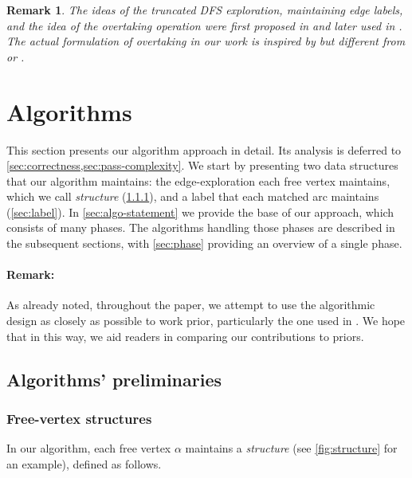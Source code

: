 \documentclass{article}
\newcommand{\alp}{\alpha}
\newtheorem{remark}{Remark}
\begin{document}
\begin{remark}
The ideas of the truncated DFS exploration, maintaining edge labels, and the idea of the overtaking operation were first proposed in \cite{eggert2009bipartite} and later used in \cite{FMU22}.
The actual formulation of overtaking in our work is inspired by but different from \cite{eggert2009bipartite} or \cite{FMU22}.
\end{remark}

\section{Algorithms} \label{sec:alg}
This section presents our algorithm approach in detail. 
Its analysis is deferred to \cref{sec:correctness,sec:pass-complexity}.
We start by presenting two data structures that our algorithm maintains: the edge-exploration each free vertex maintains, which we call \emph{structure} (\cref{sec:structure}), and a label that each matched arc maintains (\cref{sec:label}).
In \cref{sec:algo-statement} we provide the base of our approach, which consists of many phases. The algorithms handling those phases are described in the subsequent sections, with \cref{sec:phase} providing an overview of a single phase.

\paragraph{Remark:} As already noted, throughout the paper, we attempt to use the algorithmic design as closely as possible to work prior, particularly the one used in \cite{FMU22}. 
We hope that in this way, we aid readers in comparing our contributions to priors.


\subsection{Algorithms' preliminaries}

\subsubsection{Free-vertex structures}
\label{sec:structure}



In our algorithm, each free vertex $\alp$ maintains a \emph{structure} (see \cref{fig:structure} for an example), defined as follows.
\end{document}
